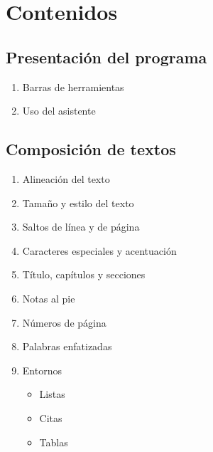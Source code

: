 \documentclass[oneside,spanish]{article}
\theoremstyle{definition}
\theoremstyle{definition}\newtheorem{definicion}{Definición}
\theoremstyle{definition}\newtheorem{ejemplo}{Ejemplo}
\theoremstyle{remark}\newtheorem{nota}{\textsc{Nota}}
\theoremstyle{definition}\newtheorem{proposicion}{Proposición}
\theoremstyle{definition}\newtheorem{problema}{Problema}
\begin{document}
\medskip

\section{Contenidos}

\subsection{Presentación del programa}
\begin{enumerate}
\item Barras de herramientas
\item Uso del asistente
\end{enumerate}

\subsection{Composición de textos}
\begin{enumerate}
\item	Alineación del texto
\item	Tamaño y estilo del texto
\item	Saltos de línea y de página
\item	Caracteres especiales y acentuación
\item	Título, capítulos y secciones
\item	Notas al pie
\item	Números de página
\item	Palabras enfatizadas
\item	Entornos
\begin{itemize}
\item	Listas
\item	Citas
\item	Tablas
\end{itemize}
\end{enumerate}
\end{document}
